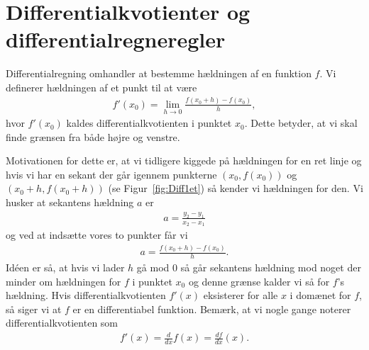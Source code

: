 \section{Differentialkvotienter og differentialregneregler}
\noindent Differentialregning omhandler at bestemme hældningen af en funktion $f$. Vi definerer hældningen af et punkt til at være
\begin{align}\label{eq:diff1et}
f'(x_0) = \lim_{h \to 0} \frac{f(x_0+h)-f(x_0)}{h},
\end{align}
hvor $f'(x_0)$ kaldes differentialkvotienten i punktet $x_0$. Dette betyder, at vi skal finde grænsen fra både højre og venstre.

Motivationen for dette er, at vi tidligere kiggede på hældningen for en ret linje og hvis vi har en sekant der går igennem punkterne $(x_0,f(x_0))$ og $(x_0+h,f(x_0+h))$ (se Figur~\ref{fig:Diff1et}) så kender vi hældningen for den. Vi husker at sekantens hældning $a$ er 
\begin{align*}
a= \frac{y_2-y_1}{x_2-x_1}
\end{align*}
og ved at indsætte vores to punkter får vi
\begin{align*}
a=\frac{f(x_0+h)-f(x_0)}{h}.
\end{align*}
Idéen er så, at hvis vi lader $h$ gå mod $0$ så går sekantens hældning mod noget der minder om hældningen for $f$ i punktet $x_0$ og denne grænse kalder vi så for $f$'s hældning. Hvis differentialkvotienten $f'(x)$ eksisterer for alle $x$ i domænet for $f$, så siger vi at $f$ er en differentiabel funktion. Bemærk, at vi nogle gange noterer differentialkvotienten som
\begin{align*}
f'(x)=\frac{d}{dx}f(x) = \frac{df}{dx}(x).
\end{align*}

